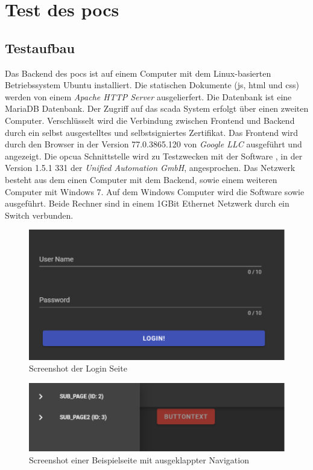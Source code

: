 \section{Test des \acp{poc} }\label{sec:poc:test}
\subsection{Testaufbau}
Das Backend des \acp{poc} ist auf einem Computer mit dem Linux-basierten Betriebssystem Ubuntu installiert. 
Die statischen Dokumente (\ac{js}, \ac{html} und \ac{css}) werden von einem \emph{Apache HTTP Server} ausgelierfert.
Die Datenbank ist eine MariaDB Datenbank.
Der Zugriff auf das \ac{scada} System erfolgt über einen zweiten Computer.
Verschlüsselt wird die Verbindung zwischen Frontend und Backend durch ein selbst ausgestelltes und selbstsigniertes Zertifikat.
Das Frontend wird durch den Browser  in der Version 77.0.3865.120 von \emph{Google LLC} ausgeführt und angezeigt.
Die \ac{opcua} Schnittstelle wird zu Testzwecken mit der Software , in der Version 1.5.1 331 der \emph{Unified Automation GmbH}, angesprochen.
Das Netzwerk besteht aus dem einen Computer mit dem Backend, sowie einem weiteren Computer mit Windows 7.
Auf dem Windows Computer wird die Software  sowie  ausgeführt.
Beide Rechner sind in einem  1GBit Ethernet Netzwerk durch ein Switch verbunden.

\begin{figure}
  \centering
  \includegraphics[width=\textwidth]{content/hauptteil/umsetzungPoC/pocTest/res/screenLogin.pdf}
  \caption{Screenshot der Login Seite}
  \label{fig:frontend:poc:login}
\end{figure}


\begin{figure}[ht]
  \centering
  \includegraphics[width=\textwidth]{content/hauptteil/umsetzungPoC/pocTest/res/screenPageNav.pdf}
  \caption{Screenshot einer Beispielseite mit ausgeklappter Navigation}
  \label{fig:frontend:poc:nav}
\end{figure}


